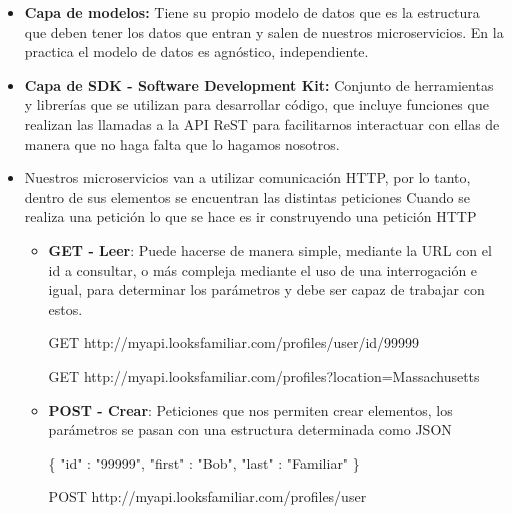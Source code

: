 \documentclass[12pt]{report} %
\begin{document}
\begin{itemize}
	\item \textbf{Capa de modelos:} Tiene su propio modelo de datos que es la estructura que deben tener los datos que entran y salen de nuestros microservicios. En la practica el modelo de datos es agnóstico, independiente.
	\item \textbf{Capa de SDK - Software Development Kit:} Conjunto de herramientas y librerías que se utilizan para desarrollar código, que incluye funciones que realizan las llamadas a la API ReST para facilitarnos interactuar con ellas de manera que no haga falta que lo hagamos nosotros.
	\item Nuestros microservicios van a utilizar comunicación HTTP, por lo tanto, dentro de sus elementos se encuentran las distintas peticiones Cuando se realiza una petición lo que se hace es ir construyendo una petición HTTP
	\begin{itemize}
		\item \textbf{GET - Leer}: Puede hacerse de manera simple, mediante la URL con el id a consultar, o más compleja mediante el uso de una interrogación e igual, para determinar los parámetros y debe ser capaz de trabajar con estos.
		
		GET http://myapi.looksfamiliar.com/profiles/user/id/99999

		GET http://myapi.looksfamiliar.com/profiles?location=Massachusetts

		\item \textbf{POST - Crear}: Peticiones que nos permiten crear elementos, los parámetros se pasan con una estructura determinada como JSON
		
		\{ "id" : "99999", "first" : "Bob", "last" : "Familiar" \}

		POST http://myapi.looksfamiliar.com/profiles/user
		

\end{itemize}
\end{itemize}
\end{document}

